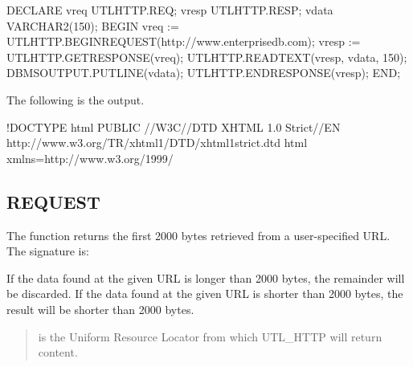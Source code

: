 \documentclass[letterpaper,10pt,english,openany,oneside]{sphinxmanual}
\begin{document}
%
\begin{sphinxVerbatim}[commandchars=\\\{\}]
DECLARE
    v\PYGZus{}req           UTL\PYGZus{}HTTP.REQ;
    v\PYGZus{}resp          UTL\PYGZus{}HTTP.RESP;
    v\PYGZus{}data          VARCHAR2(150);
BEGIN
    v\PYGZus{}req := UTL\PYGZus{}HTTP.BEGIN\PYGZus{}REQUEST(\PYGZsq{}http://www.enterprisedb.com\PYGZsq{});
    v\PYGZus{}resp := UTL\PYGZus{}HTTP.GET\PYGZus{}RESPONSE(v\PYGZus{}req);
    UTL\PYGZus{}HTTP.READ\PYGZus{}TEXT(v\PYGZus{}resp, v\PYGZus{}data, 150);
    DBMS\PYGZus{}OUTPUT.PUT\PYGZus{}LINE(v\PYGZus{}data);
    UTL\PYGZus{}HTTP.END\PYGZus{}RESPONSE(v\PYGZus{}resp);
END;
\end{sphinxVerbatim}

The following is the output.

%
\begin{sphinxVerbatim}[commandchars=\\\{\}]
\PYGZlt{}!DOCTYPE html PUBLIC \PYGZdq{}\PYGZhy{}//W3C//DTD XHTML 1.0 Strict//EN\PYGZdq{}
  \PYGZdq{}http://www.w3.org/TR/xhtml1/DTD/xhtml1\PYGZhy{}strict.dtd\PYGZdq{}\PYGZgt{}
\PYGZlt{}html xmlns=\PYGZdq{}http://www.w3.org/1999/
\end{sphinxVerbatim}


\subsection{REQUEST}
\label{\detokenize{utl_http:request}}
The  function returns the first 2000 bytes retrieved from a
user-specified URL. The signature is:
\begin{quote}

\end{quote}

If the data found at the given URL is longer than 2000 bytes, the
remainder will be discarded. If the data found at the given URL is
shorter than 2000 bytes, the result will be shorter than 2000 bytes.


\begin{quote}

 is the Uniform Resource Locator from which UTL\_HTTP will
return content.
\end{quote}
\end{document}
